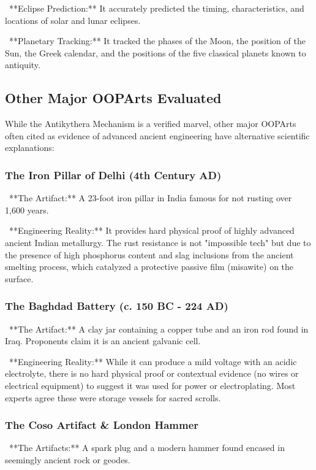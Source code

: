 \documentclass[aps,prd,11pt,onecolumn,superscriptaddress,nofootinbib,floatfix]{revtex4-2}
\begin{document}
\textbullet~**Eclipse Prediction:** It accurately predicted the timing, characteristics, and locations of solar and lunar eclipses.

\textbullet~**Planetary Tracking:** It tracked the phases of the Moon, the position of the Sun, the Greek calendar, and the positions of the five classical planets known to antiquity.



\subsection{Other Major OOPArts Evaluated}


While the Antikythera Mechanism is a verified marvel, other major OOPArts often cited as evidence of advanced ancient engineering have alternative scientific explanations:


\subsubsection{The Iron Pillar of Delhi (4th Century AD)}
\textbullet~**The Artifact:** A 23-foot iron pillar in India famous for not rusting over 1,600 years.

\textbullet~**Engineering Reality:** It provides hard physical proof of highly advanced ancient Indian metallurgy. The rust resistance is not "impossible tech" but due to the presence of high phosphorus content and slag inclusions from the ancient smelting process, which catalyzed a protective passive film (misawite) on the surface.



\subsubsection{The Baghdad Battery (c. 150 BC - 224 AD)}
\textbullet~**The Artifact:** A clay jar containing a copper tube and an iron rod found in Iraq. Proponents claim it is an ancient galvanic cell.

\textbullet~**Engineering Reality:** While it can produce a mild voltage with an acidic electrolyte, there is no hard physical proof or contextual evidence (no wires or electrical equipment) to suggest it was used for power or electroplating. Most experts agree these were storage vessels for sacred scrolls.



\subsubsection{The Coso Artifact \& London Hammer}
\textbullet~**The Artifacts:** A spark plug and a modern hammer found encased in seemingly ancient rock or geodes.
\end{document}
